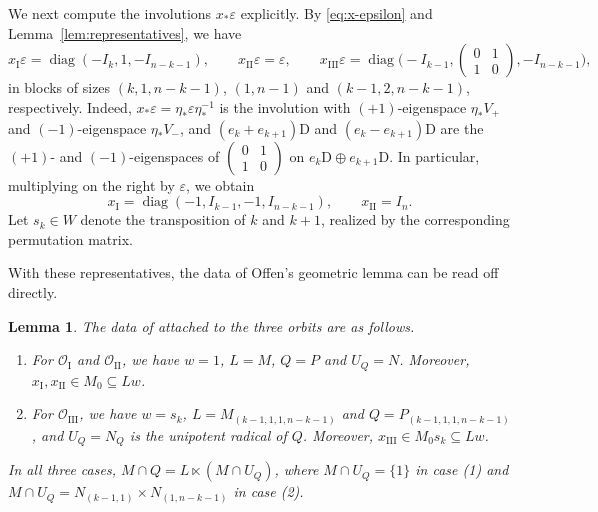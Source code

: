 \documentclass[11pt]{amsart}
\numberwithin{equation}{section}
\theoremstyle{plain}
\newtheorem{lemma}[theorem]{Lemma}
\theoremstyle{definition}
\theoremstyle{remark}
\DeclareMathOperator{\diag}{diag}
\newcommand{\OI}{\mathcal{O}_{\mathrm{I}}}
\newcommand{\OII}{\mathcal{O}_{\mathrm{II}}}
\newcommand{\OIII}{\mathcal{O}_{\mathrm{III}}}
\begin{document}
We next compute the involutions $x_*\varepsilon$ explicitly. By \eqref{eq:x-epsilon} and Lemma~\ref{lem:representatives}, we have
\begin{equation}\label{eq:x-epsilon-explicit}
	x_{\mathrm I}\varepsilon=\diag(-I_k,1,-I_{n-k-1}),\qquad x_{\mathrm{II}}\varepsilon=\varepsilon,\qquad x_{\mathrm{III}}\varepsilon=\diag\Big(-I_{k-1},\begin{pmatrix}0&1\\1&0\end{pmatrix},-I_{n-k-1}\Big),
\end{equation}
in blocks of sizes $(k,1,n-k-1)$, $(1,n-1)$ and $(k-1,2,n-k-1)$, respectively. Indeed, $x_*\varepsilon=\eta_*\varepsilon\eta_*^{-1}$ is the involution with $(+1)$-eigenspace $\eta_*V_+$ and $(-1)$-eigenspace $\eta_*V_-$, and $(e_k+e_{k+1})\mathrm{D}$ and $(e_k-e_{k+1})\mathrm{D}$ are the $(+1)$- and $(-1)$-eigenspaces of $\left(\begin{smallmatrix}0&1\\1&0\end{smallmatrix}\right)$ on $e_k\mathrm{D}\oplus e_{k+1}\mathrm{D}$. In particular, multiplying on the right by $\varepsilon$, we obtain
$$
x_{\mathrm I}=\diag(-1,I_{k-1},-1,I_{n-k-1}),\qquad x_{\mathrm{II}}=I_n.
$$
Let $s_k\in W$ denote the transposition of $k$ and $k+1$, realized by the corresponding permutation matrix.

With these representatives, the data of Offen's geometric lemma can be read off directly.

\begin{lemma}\label{lem:offen-data}
	The data of \cite[\S3]{Off17} attached to the three orbits are as follows.
	\begin{enumerate}
		\item For $\OI$ and $\OII$, we have $w=1$, $L=M$, $Q=P$ and $U_Q=N$. Moreover, $x_{\mathrm I},x_{\mathrm{II}}\in M_0\subseteq Lw$.
		\item For $\OIII$, we have $w=s_k$, $L=M_{(k-1,1,1,n-k-1)}$ and $Q=P_{(k-1,1,1,n-k-1)}$, and $U_Q=N_Q$ is the unipotent radical of $Q$. Moreover, $x_{\mathrm{III}}\in M_0s_k\subseteq Lw$.
	\end{enumerate}
	In all three cases, $M\cap Q=L\ltimes(M\cap U_Q)$, where $M\cap U_Q=\{1\}$ in case \textup{(1)} and $M\cap U_Q=N_{(k-1,1)}\times N_{(1,n-k-1)}$ in case \textup{(2)}.
\end{lemma}
\end{document}

